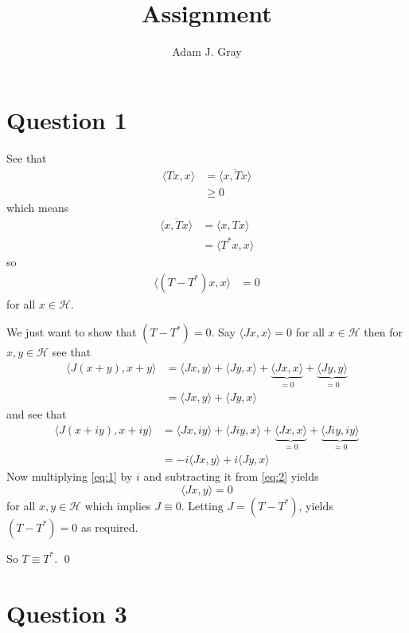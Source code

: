 \documentclass{unswmaths}
\begin{document}
\author{Adam J. Gray}
\title{Assignment}
\subject{Functional Analysis}

\unswtitle
\unswantiplagdec
\section*{Question 1}
See that
\begin{align*}
	\langle Tx, x \rangle &= \overline{\langle x, Tx \rangle} \\
		&\geq 0
\end{align*}
which means
\begin{align*}
	\overline{\langle x, Tx \rangle} &= \langle x, Tx \rangle \\
	    &= \langle T^* x, x \rangle
\end{align*}
so
\begin{align*}
	\langle (T - T^*)x, x \rangle &= 0
\end{align*}
for all $ x \in \mathcal{H} $.

We just want to show that $ (T - T^*) = 0 $. 
Say $ \langle Jx, x \rangle  = 0 $ for all $ x \in \mathcal{H} $ 
then for $ x, y \in \mathcal{H} $ see that 
\begin{align}
    \langle J(x + y), x + y \rangle &= \langle Jx, y \rangle 
        + \langle Jy, x \rangle + \underbrace{\langle Jx, x \rangle}_{=0}
        + \underbrace{\langle Jy, y \rangle}_{=0} \nonumber \\
        \label{eq:1}
        &= \langle Jx, y \rangle + \langle Jy, x \rangle
\end{align}
and see that
\begin{align} 
    \langle J(x + iy), x + iy \rangle &= \langle Jx, iy \rangle 
        + \langle Jiy, x \rangle + \underbrace{\langle Jx, x \rangle}_{=0}
        + \underbrace{\langle Jiy, iy \rangle}_{=0} \nonumber \\
        &= -i\langle Jx, y \rangle + i\langle Jy, x \rangle  
        \label{eq:2}
\end{align}
Now multiplying \eqref{eq:1} by $ i $ and subtracting it from \eqref{eq:2} yields
$$
    \langle Jx, y \rangle = 0
$$
for all $ x, y \in \mathcal{H} $ which implies $ J \equiv 0 $.
Letting $ J = (T - T^*) $, yields $ (T - T^*) = 0 $ as required.

So $ T \equiv T^* $. \qed

\section*{Question 3}
\end{document}
